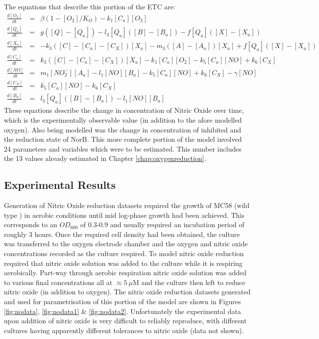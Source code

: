 The equations that describe this portion of the ETC are:
\begin{eqnarray*}
\frac{d[O_2]}{dt} & = & \beta(1-[O_2]/K_O) - k_{1}[C_a][O_2]\\
\frac{d[Q_a]}{dt} & = & g([Q] - [Q_a]) - l_3[Q_a]([B] - [B_a]) - f[Q_a]([X]-[X_a])\\
\frac{d[X_a]}{dt} & = & -k_3([C] - [C_a] - [C_X])[X_a]  - m_3([A] - [A_a])[X_a] + f[Q_a]([X]-[X_a])\\
\frac{d[C_a]}{dt} & = & k_3([C] - [C_a] - [C_X])[X_a] - k_{1}[C_a][O_2] - k_5[C_a][NO] + k_6[C_X]\\
\frac{d[NO]}{dt} & = & m_{1}[NO_2^-][A_a] - l_1[NO][B_a] - k_5[C_a][NO] + k_6 [C_X] - \gamma[NO]\\
\frac{d[C_X]}{dt} & = & k_5[C_a][NO] - k_6 [C_X]\\
\frac{d[B_a]}{dt} & = & l_3[Q_a]([B] - [B_a]) - l_1[NO][B_a]
\end{eqnarray*}
These equations describe the change in concentration of Nitric Oxide over time, which is the experimentally observable value (in addition to the afore modelled oxygen). Also being modelled was the change in concentration of inhibited \cbbthree{} and the reduction state of NorB. This more complete portion of the model involved 24 parameters and variables which were to be estimated. This number includes the 13 values already estimated in Chapter \ref{chap:oxygenreduction}.
\subsection{Experimental Results}
Generation of Nitric Oxide reduction datasets required the growth of MC58 (wild type \Nsm{}) in aerobic conditions until mid log-phase growth had been achieved. This corresponds to an $OD_{600}$ of 0.3-0.9 and usually required an incubation period of roughly 3 hours. Once the required cell density had been obtained, the culture was transferred to the oxygen electrode chamber and the oxygen and nitric oxide concentrations recorded as the culture respired. To model nitric oxide reduction required that nitric oxide solution was added to the culture while it is respiring aerobically. Part-way through aerobic respiration nitric oxide solution was added to various final concentrations all at $\approx 5~\mu$M and the culture then left to reduce nitric oxide (in addition to oxygen). The nitric oxide reduction datasets generated and used for parametrisation of this portion of the model are shown in Figures \ref{fig:nodata}, \ref{fig:nodata1} \& \ref{fig:nodata2}. Unfortunately the experimental data upon addition of nitric oxide is very difficult to reliably reproduce, with different cultures having apparently different tolerances to nitric oxide (data not shown).

